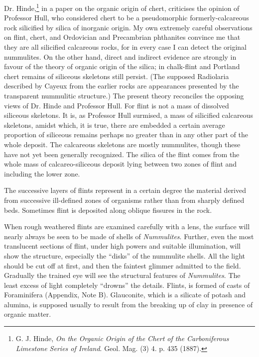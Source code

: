 \documentclass[a4paper, 12pt, oneside]{article}
\begin{document}
Dr. Hinde,\footnote{G. J. Hinde, \emph{On the Organic Origin of the Chert of the Carboniferous Limestone Series of Ireland}. Geol. Mag. (3) 4. p. 435 (1887).} in a paper on the organic origin of chert, criticises the opinion of Professor Hull, who considered chert to be a pseudomorphic formerly-calcareous rock silicified by silica of inorganic origin. My own extremely careful observations on flint, chert, and Ordovician and Precambrian phthanites convince me that they are all silicified calcareous rocks, for in every case I can detect the original nummulites. On the other hand, direct and indirect evidence are strongly in favour of the theory of organic origin of the silica; in chalk-flint and Portland chert remains of siliceous skeletons still persist. (The supposed Radiolaria described by Cayeux from the earlier rocks are appearances presented by the transparent nummulitic structure.) The present theory reconciles the opposing views of Dr. Hinde and Professor Hull. For flint is not a mass of dissolved siliceous skeletons. It is, as Professor Hull surmised, a mass of silicified calcareous skeletons, amidst which, it is true, there are embedded a certain average proportion of siliceous remains perhaps no greater than in any other part of the whole deposit. The calcareous skeletons are mostly nummulites, though these have not yet been generally recognized. The silica of the flint comes from the whole mass of calcareo-siliceous deposit lying between two zones of flint and including the lower zone.

The successive layers of flints represent in a certain degree the material derived from successive ill-defined zones of organisms rather than from sharply defined beds. Sometimes flint is deposited along oblique fissures in the rock.

When rough weathered flints are examined carefully with a lens, the surface will nearly always be seen to be made of shells of \emph{Nummulites}. Further, even the most translucent sections of flint, under high powers and suitable illumination, will show the structure, especially the ``disks'' of the nummulite shells. All the light should be cut off at first, and then the faintest glimmer admitted to the field. Gradually the trained eye will see the structural features of \emph{Nummulites}. The least excess of light completely ``drowns'' the details. Flints, is formed of casts of Foraminifera (Appendix, Note B). Glauconite, which is a silicate of potash and alumina, is supposed usually to result from the breaking up of clay in presence of organic matter.
\end{document}
